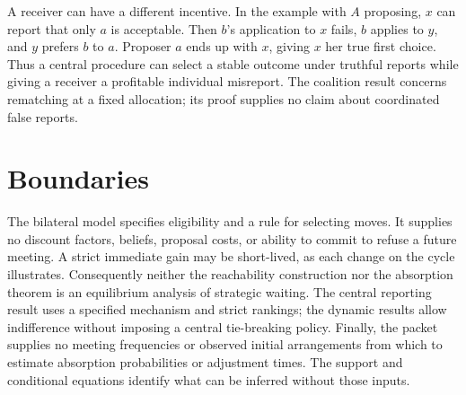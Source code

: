 \documentclass[11pt]{article}
\begin{document}
A receiver can have a different incentive. In the example with \(A\) proposing, \(x\) can report that only \(a\) is acceptable. Then \(b\)'s application to \(x\) fails, \(b\) applies to \(y\), and \(y\) prefers \(b\) to \(a\). Proposer \(a\) ends up with \(x\), giving \(x\) her true first choice. Thus a central procedure can select a stable outcome under truthful reports while giving a receiver a profitable individual misreport. The coalition result concerns rematching at a fixed allocation; its proof supplies no claim about coordinated false reports.

\section{Boundaries}

The bilateral model specifies eligibility and a rule for selecting moves. It supplies no discount factors, beliefs, proposal costs, or ability to commit to refuse a future meeting. A strict immediate gain may be short-lived, as each change on the cycle illustrates. Consequently neither the reachability construction nor the absorption theorem is an equilibrium analysis of strategic waiting. The central reporting result uses a specified mechanism and strict rankings; the dynamic results allow indifference without imposing a central tie-breaking policy. Finally, the packet supplies no meeting frequencies or observed initial arrangements from which to estimate absorption probabilities or adjustment times. The support and conditional equations identify what can be inferred without those inputs.
\end{document}
